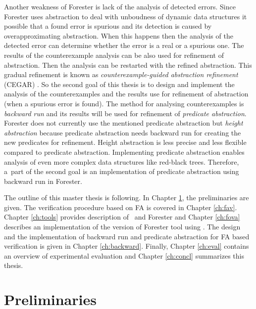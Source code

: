 Another weakness of Forester is lack of the analysis of detected errors.
Since Forester uses abstraction to deal with unboudness of dynamic data structures
it possible that a found error is spurious and its detection is caused by overapproximating abstraction.
When this happens then the analysis of the detected error can determine
whether the error is a real or a spurious one.
The results of the counterexample analysis can be also used for refinement of abstraction.
Then the analysis can be restarted with the refined abstraction.
This gradual refinement is known as \emph{counterexample-guided abstraction refinement} (CEGAR) \cite{cegar}.
So the second goal of this thesis is to design and implement the analysis of the counterexamples
and the results use for refinement of abstraction (when a spurious error is found).
The method for analysing counterexamples is \emph{backward run}
and its results will be used for refinement of \emph{predicate abstraction}.
Forester does not currently use the mentioned predicate abstraction but \emph{height abstraction}
because predicate abstraction needs backward run for creating the new predicates for refinement.
Height abstraction is less precise and less flexible compared to predicate abstraction.
Implementing predicate abstraction enables analysis of even more complex data structures like red-black trees.
Therefore, a~part of the second goal is an implementation of predicate abstraction using backward run in Forester.

The outline of this master thesis is following.
In Chapter \ref{ch:prel}, the preliminaries are given.
The verification procedure based on FA is covered in Chapter \ref{ch:fav}.
Chapter \ref{ch:tools} provides description of \vata\ and Forester
and Chapter \ref{ch:fova} describes an implementation of the version of Forester tool using \vata.
The design and the implementation of backward run and predicate abstraction
for FA based verification is given in Chapter \ref{ch:backward}.
Finally, Chapter \ref{ch:eval} contains an overview of experimental evaluation and 
Chapter \ref{ch:concl} summarizes this thesis.

\chapter{Preliminaries}
\label{ch:prel}

